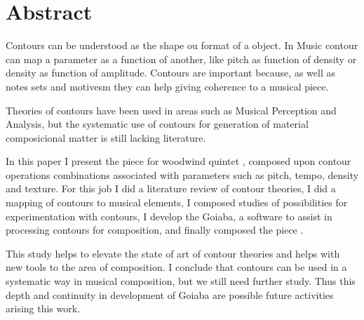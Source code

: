 \chapter*{Abstract}
\label{cha:abstract}

Contours can be understood as the shape ou format of a object. In
Music contour can map a parameter as a function of another, like pitch
as function of density or density as function of amplitude. Contours
are important because, as well as notes sets and motivesm they can
help giving coherence to a musical piece.

Theories of contours have been used in areas such as Musical
Perception and Analysis, but the systematic use of contours for
generation of material composicional matter is still lacking
literature.

In this paper I present the piece for woodwind quintet \obra{},
composed upon contour operations combinations associated with
parameters such as pitch, tempo, density and texture. For this job I
did a literature review of contour theories, I did a mapping of
contours to musical elements, I composed studies of possibilities for
experimentation with contours, I develop the Goiaba, a software to
assist in processing contours for composition, and finally composed
the piece \obra{}.

This study helps to elevate the state of art of contour theories and
helps with new tools to the area of composition.
I conclude that contours can be used in a systematic way in musical
composition, but we still need further study. Thus this depth and
continuity in development of Goiaba are possible future activities
arising this work.
